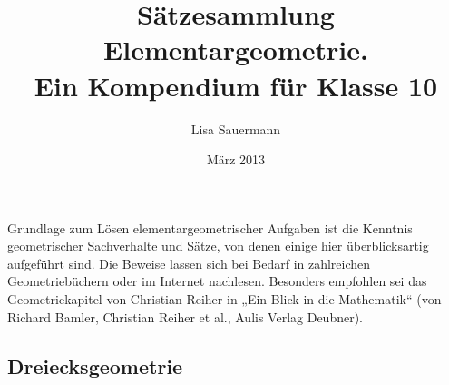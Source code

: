 \documentclass[11pt,a4paper]{article}
\title{Sätzesammlung Elementargeometrie.\\ Ein Kompendium für Klasse
  10\kosemnetlicensemark}
\author{Lisa Sauermann}
\date{März 2013}
\begin{document}
\maketitle

Grundlage zum Lösen elementargeometrischer Aufgaben ist die Kenntnis
geometrischer Sachverhalte und Sätze, von denen einige hier überblicksartig
aufgeführt sind. Die Beweise lassen sich bei Bedarf in zahlreichen
Geometriebüchern oder im Internet nachlesen. Besonders empfohlen sei das
Geometriekapitel von Christian Reiher in „Ein-Blick in die Mathematik“ (von
Richard Bamler, Christian Reiher et al., Aulis Verlag Deubner).

\subsection*{Dreiecksgeometrie}
\end{document}
